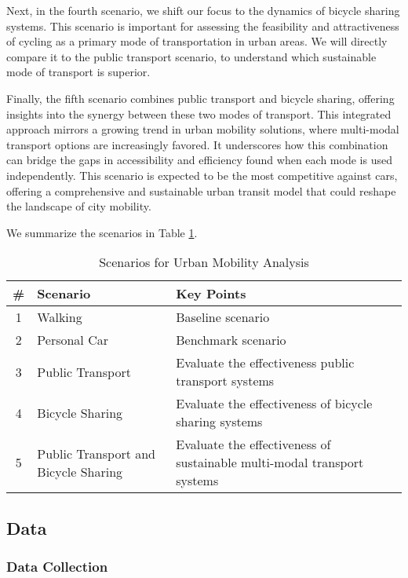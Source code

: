 Next, in the fourth scenario, we shift our focus to the dynamics of bicycle sharing systems. 
This scenario is important for assessing the feasibility and attractiveness of cycling as a primary mode of transportation in urban areas. 
We will directly compare it to the public transport scenario, to understand which sustainable mode of transport is superior.

Finally, the fifth scenario combines public transport and bicycle sharing, offering insights into the synergy between these two modes of transport. 
This integrated approach mirrors a growing trend in urban mobility solutions, where multi-modal transport options are increasingly favored. 
It underscores how this combination can bridge the gaps in accessibility and efficiency found when each mode is used independently. 
This scenario is expected to be the most competitive against cars, offering a comprehensive and sustainable urban transit model that could reshape the landscape of city mobility.

We summarize the scenarios in Table \ref{table:scenarios}.

\begin{table}[h]
\centering
\begin{tabular}{|c|p{5cm}|p{5cm}|}
\hline
\textbf{\#} & \textbf{Scenario} & \textbf{Key Points} \\
\hline
1 & Walking & Baseline scenario \\
\hline
2 & Personal Car & Benchmark scenario \\
\hline
3 & Public Transport & Evaluate the effectiveness public transport systems \\
\hline
4 & Bicycle Sharing & Evaluate the effectiveness of bicycle sharing systems \\
\hline
5 & Public Transport and Bicycle Sharing & Evaluate the effectiveness of sustainable multi-modal transport systems \\
\hline
\end{tabular}
\caption{Scenarios for Urban Mobility Analysis}
\label{table:scenarios}
\end{table}

\subsection{Data}
\label{subs:data}

\subsubsection{Data Collection}
\label{subs:data_collection}

